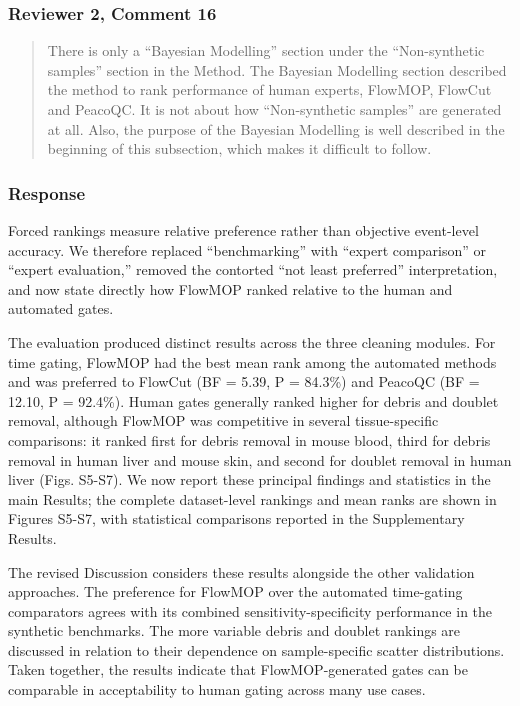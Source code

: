 \documentclass[
  11pt,
  a4paper,
]{article}
\begin{document}
\subsubsection{Reviewer 2, Comment 16}\label{reviewer-2-comment-16}

\begin{quote}
There is only a ``Bayesian Modelling'' section under the ``Non-synthetic
samples'' section in the Method. The Bayesian Modelling section
described the method to rank performance of human experts, FlowMOP,
FlowCut and PeacoQC. It is not about how ``Non-synthetic samples'' are
generated at all. Also, the purpose of the Bayesian Modelling is well
described in the beginning of this subsection, which makes it difficult
to follow.
\end{quote}

\subsubsection{Response}\label{response-5}

Forced rankings measure relative preference rather than objective
event-level accuracy. We therefore replaced ``benchmarking'' with
``expert comparison'' or ``expert evaluation,'' removed the contorted
``not least preferred'' interpretation, and now state directly how
FlowMOP ranked relative to the human and automated gates.

The evaluation produced distinct results across the three cleaning
modules. For time gating, FlowMOP had the best mean rank among the
automated methods and was preferred to FlowCut (BF = 5.39, P = 84.3\%)
and PeacoQC (BF = 12.10, P = 92.4\%). Human gates generally ranked
higher for debris and doublet removal, although FlowMOP was competitive
in several tissue-specific comparisons: it ranked first for debris
removal in mouse blood, third for debris removal in human liver and
mouse skin, and second for doublet removal in human liver (Figs. S5-S7).
We now report these principal findings and statistics in the main
Results; the complete dataset-level rankings and mean ranks are shown in
Figures S5-S7, with statistical comparisons reported in the
Supplementary Results.

The revised Discussion considers these results alongside the other
validation approaches. The preference for FlowMOP over the automated
time-gating comparators agrees with its combined sensitivity-specificity
performance in the synthetic benchmarks. The more variable debris and
doublet rankings are discussed in relation to their dependence on
sample-specific scatter distributions. Taken together, the results
indicate that FlowMOP-generated gates can be comparable in acceptability
to human gating across many use cases.
\end{document}
